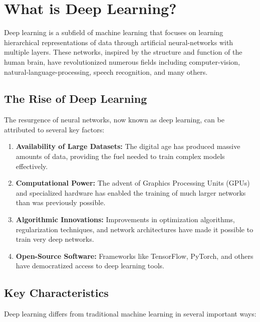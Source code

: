 
\section{What is Deep Learning?}
\label{sec:what-is-dl}

Deep learning is a subfield of machine learning that focuses on learning hierarchical representations of data through artificial \gls{neural-network}s with multiple layers. These networks, inspired by the structure and function of the human brain, have revolutionized numerous fields including \gls{computer-vision}, \gls{natural-language-processing}, speech recognition, and many others.

\subsection{The Rise of Deep Learning}

The resurgence of neural networks, now known as deep learning, can be attributed to several key factors:

\begin{enumerate}
    \item \textbf{Availability of Large Datasets:} The digital age has produced massive amounts of data, providing the fuel needed to train complex models effectively.
    
    \item \textbf{Computational Power:} The advent of Graphics Processing Units (GPUs) and specialized hardware has enabled the training of much larger networks than was previously possible.
    
    \item \textbf{Algorithmic Innovations:} Improvements in optimization algorithms, regularization techniques, and network architectures have made it possible to train very deep networks.
    
    \item \textbf{Open-Source Software:} Frameworks like TensorFlow, PyTorch, and others have democratized access to deep learning tools.
\end{enumerate}

\subsection{Key Characteristics}

Deep learning differs from traditional machine learning in several important ways:

